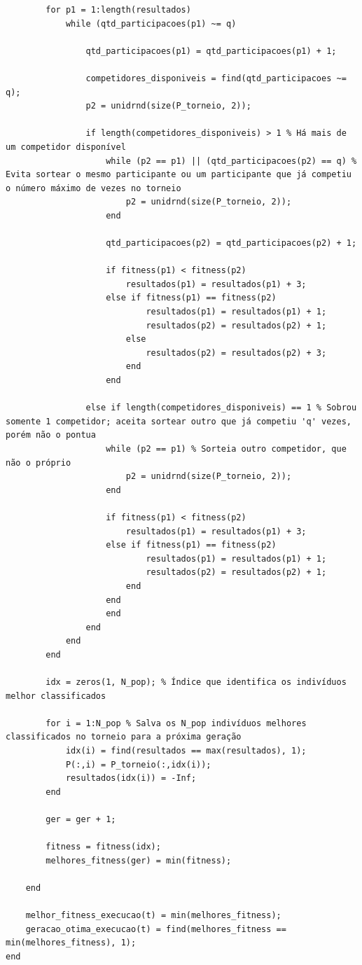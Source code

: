 \documentclass{report}
\begin{document}
\begin{lstlisting}
        for p1 = 1:length(resultados)
            while (qtd_participacoes(p1) ~= q)
                
                qtd_participacoes(p1) = qtd_participacoes(p1) + 1;
                
                competidores_disponiveis = find(qtd_participacoes ~= q);                    
                p2 = unidrnd(size(P_torneio, 2));
                
                if length(competidores_disponiveis) > 1 % Há mais de um competidor disponível
                    while (p2 == p1) || (qtd_participacoes(p2) == q) % Evita sortear o mesmo participante ou um participante que já competiu o número máximo de vezes no torneio
                        p2 = unidrnd(size(P_torneio, 2));
                    end
                                        
                    qtd_participacoes(p2) = qtd_participacoes(p2) + 1;
                    
                    if fitness(p1) < fitness(p2)
                        resultados(p1) = resultados(p1) + 3;
                    else if fitness(p1) == fitness(p2)
                            resultados(p1) = resultados(p1) + 1;
                            resultados(p2) = resultados(p2) + 1;
                        else
                            resultados(p2) = resultados(p2) + 3;
                        end
                    end
                    
                else if length(competidores_disponiveis) == 1 % Sobrou somente 1 competidor; aceita sortear outro que já competiu 'q' vezes, porém não o pontua
                    while (p2 == p1) % Sorteia outro competidor, que não o próprio
                        p2 = unidrnd(size(P_torneio, 2));
                    end
                    
                    if fitness(p1) < fitness(p2)
                        resultados(p1) = resultados(p1) + 3;
                    else if fitness(p1) == fitness(p2)
                            resultados(p1) = resultados(p1) + 1;
                            resultados(p2) = resultados(p2) + 1;
                        end
                    end
                    end
                end                        
            end
        end
        
        idx = zeros(1, N_pop); % Índice que identifica os indivíduos melhor classificados
        
        for i = 1:N_pop % Salva os N_pop indivíduos melhores classificados no torneio para a próxima geração
            idx(i) = find(resultados == max(resultados), 1);
            P(:,i) = P_torneio(:,idx(i));
            resultados(idx(i)) = -Inf;
        end
        
        ger = ger + 1;
        
        fitness = fitness(idx);
        melhores_fitness(ger) = min(fitness);              
        
    end
    
    melhor_fitness_execucao(t) = min(melhores_fitness);
    geracao_otima_execucao(t) = find(melhores_fitness == min(melhores_fitness), 1);
end
\end{lstlisting}
\end{document}
